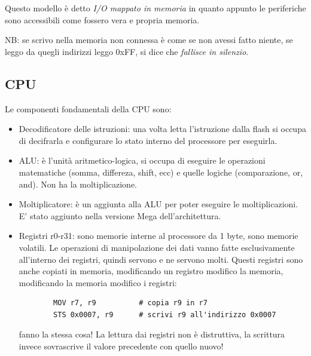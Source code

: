 Questo modello è detto \emph{I/O mappato in memoria} in quanto appunto le periferiche sono accessibili come fossero vera e propria memoria.

NB: se scrivo nella memoria non connessa è come se non avessi fatto niente, se leggo da quegli indirizzi leggo 0xFF, si dice che \emph{fallisce in silenzio}.


\subsection{CPU}
Le componenti fondamentali della CPU sono:
\begin{itemize}
    \item Decodificatore delle istruzioni: una volta letta l'istruzione dalla flash si occupa di decifrarla e configurare lo stato interno del processore per eseguirla.
    \item ALU: è l'unità aritmetico-logica, si occupa di eseguire le operazioni matematiche (somma, differeza, shift, ecc) e quelle logiche (comparazione, or, and). Non ha la moltiplicazione.
    \item Moltiplicatore: è un aggiunta alla ALU per poter eseguire le moltiplicazioni. E' stato aggiunto nella versione Mega dell'architettura.
    \item Registri r0-r31: sono memorie interne al processore da 1 byte, sono memorie volatili. Le operazioni di manipolazione dei dati vanno fatte esclusivamente all'interno dei registri, quindi servono e ne servono molti. Questi registri sono anche copiati in memoria, modificando un registro modifico la memoria, modificando la memoria modifico i registri:
    \begin{verbatim}
        MOV r7, r9          # copia r9 in r7
        STS 0x0007, r9      # scrivi r9 all'indirizzo 0x0007
    \end{verbatim}
    fanno la stessa cosa!
    La lettura dai registri non è distruttiva, la scrittura invece sovrascrive il valore precedente con quello nuovo!
\end{itemize}


